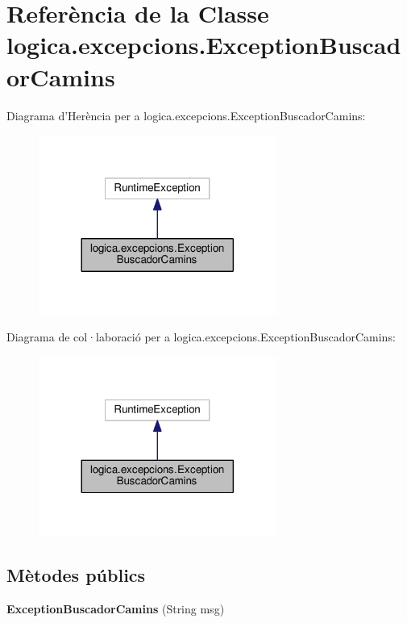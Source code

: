 \hypertarget{classlogica_1_1excepcions_1_1_exception_buscador_camins}{\section{Referència de la Classe logica.\+excepcions.\+Exception\+Buscador\+Camins}
\label{classlogica_1_1excepcions_1_1_exception_buscador_camins}
}


Diagrama d'Herència per a logica.\+excepcions.\+Exception\+Buscador\+Camins\+:\nopagebreak
\begin{figure}[H]
\begin{center}
\leavevmode
\includegraphics[width=221pt]{classlogica_1_1excepcions_1_1_exception_buscador_camins__inherit__graph}
\end{center}
\end{figure}


Diagrama de col·laboració per a logica.\+excepcions.\+Exception\+Buscador\+Camins\+:\nopagebreak
\begin{figure}[H]
\begin{center}
\leavevmode
\includegraphics[width=221pt]{classlogica_1_1excepcions_1_1_exception_buscador_camins__coll__graph}
\end{center}
\end{figure}
\subsection*{Mètodes públics}
\begin{DoxyCompactItemize}
\item 
\hypertarget{classlogica_1_1excepcions_1_1_exception_buscador_camins_aeed0d26e981ac44480c22fecc3f24b85}{{\bfseries Exception\+Buscador\+Camins} (String msg)}\label{classlogica_1_1excepcions_1_1_exception_buscador_camins_aeed0d26e981ac44480c22fecc3f24b85}

\end{DoxyCompactItemize}


